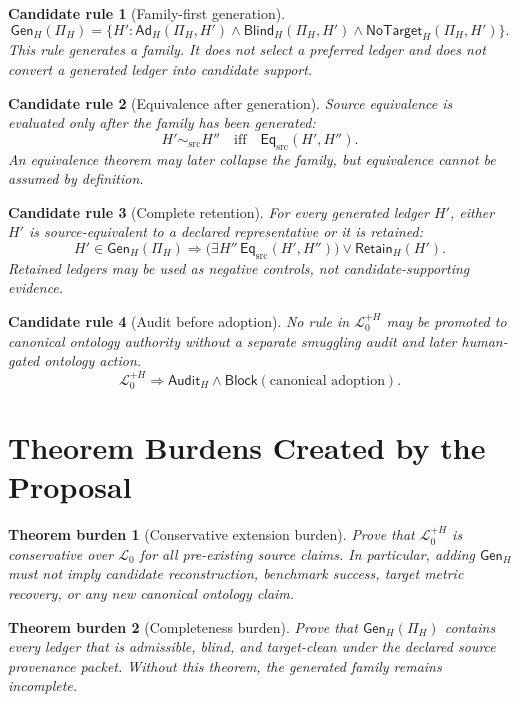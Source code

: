 \documentclass[11pt]{article}
\newcommand{\Lang}{\mathcal{L}_{0}}
\newcommand{\LangPlus}{\mathcal{L}_{0}^{+H}}
\newcommand{\Ad}{\mathsf{Ad}}
\newcommand{\Blind}{\mathsf{Blind}}
\newcommand{\GenH}{\mathsf{Gen}_{H}}
\newcommand{\EqSrc}{\mathsf{Eq}_{\mathrm{src}}}
\newcommand{\Retain}{\mathsf{Retain}}
\newcommand{\NoTarget}{\mathsf{NoTarget}}
\newcommand{\Audit}{\mathsf{Audit}}
\newcommand{\Block}{\mathsf{Block}}
\newtheorem{axiomcandidate}{Candidate rule}
\newtheorem{burden}{Theorem burden}
\begin{document}
\begin{axiomcandidate}[Family-first generation]
\[
\GenH(\Pi_H)=
\{H' : \Ad_H(\Pi_H,H')\wedge \Blind_H(\Pi_H,H')\wedge \NoTarget_H(\Pi_H,H')\}.
\]
This rule generates a family. It does not select a preferred ledger and does
not convert a generated ledger into candidate support.
\end{axiomcandidate}

\begin{axiomcandidate}[Equivalence after generation]
Source equivalence is evaluated only after the family has been generated:
\[
H'\sim_{\mathrm{src}}H'' \quad \text{iff} \quad \EqSrc(H',H'').
\]
An equivalence theorem may later collapse the family, but equivalence cannot
be assumed by definition.
\end{axiomcandidate}

\begin{axiomcandidate}[Complete retention]
For every generated ledger \(H'\), either \(H'\) is source-equivalent to a
declared representative or it is retained:
\[
H'\in\GenH(\Pi_H)
\Rightarrow
\bigl(\exists H''\,\EqSrc(H',H'')\bigr)
\vee
\Retain_H(H').
\]
Retained ledgers may be used as negative controls, not candidate-supporting
evidence.
\end{axiomcandidate}

\begin{axiomcandidate}[Audit before adoption]
No rule in \(\LangPlus\) may be promoted to canonical ontology authority
without a separate smuggling audit and later human-gated ontology action.
\[
\LangPlus \Rightarrow \Audit_H \wedge \Block(\text{canonical adoption}).
\]
\end{axiomcandidate}

\section{Theorem Burdens Created by the Proposal}

\begin{burden}[Conservative extension burden]
Prove that \(\LangPlus\) is conservative over \(\Lang\) for all
pre-existing source claims. In particular, adding \(\GenH\) must not imply
candidate reconstruction, benchmark success, target metric recovery, or any
new canonical ontology claim.
\end{burden}

\begin{burden}[Completeness burden]
Prove that \(\GenH(\Pi_H)\) contains every ledger that is admissible,
blind, and target-clean under the declared source provenance packet. Without
this theorem, the generated family remains incomplete.
\end{burden}
\end{document}
